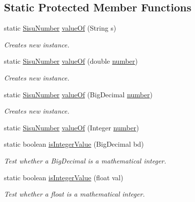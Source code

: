 \subsection*{Static Protected Member Functions}
\begin{DoxyCompactItemize}
\item 
static \hyperlink{classcom_1_1aarrelaakso_1_1drawl_1_1_sisu_number}{Sisu\+Number} \hyperlink{classcom_1_1aarrelaakso_1_1drawl_1_1_sisu_number_a2fa3f605463c6f5cb21a08c93289cab3}{value\+Of} (String s)
\begin{DoxyCompactList}\small\item\em Creates new instance. \end{DoxyCompactList}\item 
static \hyperlink{classcom_1_1aarrelaakso_1_1drawl_1_1_sisu_number}{Sisu\+Number} \hyperlink{classcom_1_1aarrelaakso_1_1drawl_1_1_sisu_number_aab56528a184c765d49d9e86f2160c1fa}{value\+Of} (double \hyperlink{classcom_1_1aarrelaakso_1_1drawl_1_1_sisu_number_a5741c4131458787e3adb0bfe649d7758}{number})
\begin{DoxyCompactList}\small\item\em Creates new instance. \end{DoxyCompactList}\item 
static \hyperlink{classcom_1_1aarrelaakso_1_1drawl_1_1_sisu_number}{Sisu\+Number} \hyperlink{classcom_1_1aarrelaakso_1_1drawl_1_1_sisu_number_a6cf69a1e3d5930733a6450547e238fa6}{value\+Of} (Big\+Decimal \hyperlink{classcom_1_1aarrelaakso_1_1drawl_1_1_sisu_number_a5741c4131458787e3adb0bfe649d7758}{number})
\begin{DoxyCompactList}\small\item\em Creates new instance. \end{DoxyCompactList}\item 
static \hyperlink{classcom_1_1aarrelaakso_1_1drawl_1_1_sisu_number}{Sisu\+Number} \hyperlink{classcom_1_1aarrelaakso_1_1drawl_1_1_sisu_number_accb397fda90ea57fefeab7da195d4dd0}{value\+Of} (Integer \hyperlink{classcom_1_1aarrelaakso_1_1drawl_1_1_sisu_number_a5741c4131458787e3adb0bfe649d7758}{number})
\item 
static boolean \hyperlink{classcom_1_1aarrelaakso_1_1drawl_1_1_sisu_number_a455fdec2fc1de7bc6d2b6388f5e5427a}{is\+Integer\+Value} (Big\+Decimal bd)
\begin{DoxyCompactList}\small\item\em Test whether a Big\+Decimal is a mathematical integer. \end{DoxyCompactList}\item 
static boolean \hyperlink{classcom_1_1aarrelaakso_1_1drawl_1_1_sisu_number_ab681f2c8e768f0557e6e3bca795fc135}{is\+Integer\+Value} (float val)
\begin{DoxyCompactList}\small\item\em Test whether a float is a mathematical integer. \end{DoxyCompactList}\end{DoxyCompactItemize}
